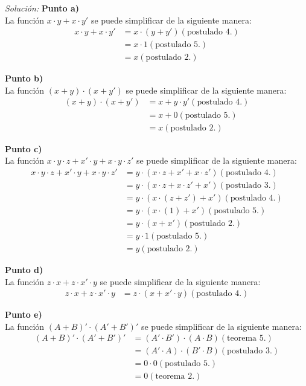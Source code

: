 \documentclass{article}
\newenvironment{solution}
    {\textit{Solución:}}
    {}
\begin{document}
\begin{solution}
\textbf{Punto a)}\\
La función $x \cdot y + x \cdot y'$ se puede simplificar de la siguiente manera:
\begin{align*}
    x \cdot y + x \cdot y' &= x \cdot (y + y') (\text{postulado 4.}) \\
    &= x \cdot 1 (\text{postulado 5.}) \\
    &= x (\text{postulado 2.})
\end{align*}

\textbf{Punto b)}\\
La función $( x + y ) \cdot ( x + y')$ se puede simplificar de la siguiente manera:
\begin{align*}
    ( x + y ) \cdot ( x + y') &= x + y\cdot y' (\text{postulado 4.}) \\
    &= x + 0 (\text{postulado 5.}) \\
    &= x (\text{postulado 2.}) 
\end{align*}

\textbf{Punto c)}\\
La función $x\cdot y \cdot z + x' \cdot y + x \cdot y \cdot z'$ se puede simplificar de la siguiente manera:
\begin{align*}
    x\cdot y \cdot z + x' \cdot y + x \cdot y \cdot z' &= y \cdot (x \cdot z + x' + x \cdot z') (\text{postulado 4.}) \\
    &= y \cdot (x \cdot z + x \cdot z' + x') (\text{postulado 3.}) \\
    &= y \cdot (x \cdot ( z + z') + x') (\text{postulado 4.}) \\
    &= y \cdot (x \cdot (1) + x') (\text{postulado 5.}) \\
    &= y \cdot (x + x') (\text{postulado 2.}) \\
    &= y \cdot 1 (\text{postulado 5.}) \\
    &= y (\text{postulado 2.})
\end{align*}

\textbf{Punto d)}\\
La función $z \cdot x + z \cdot x' \cdot y$ se puede simplificar de la siguiente manera:
\begin{align*}
    z \cdot x + z \cdot x' \cdot y &= z \cdot (x + x' \cdot y) (\text{postulado 4.}) 
\end{align*}

\textbf{Punto e)}\\
La función $(A+B)' \cdot (A' + B')'$ se puede simplificar de la siguiente manera:
\begin{align*}
    (A+B)' \cdot (A' + B')' &= (A' \cdot B') \cdot (A \cdot B) (\text{teorema 5.}) \\
    &= (A' \cdot A) \cdot (B' \cdot B) (\text{postulado 3.}) \\
    &= 0 \cdot 0 (\text{postulado 5.}) \\
    &= 0 (\text{teorema 2.})
\end{align*}


\end{solution}
\end{document}

